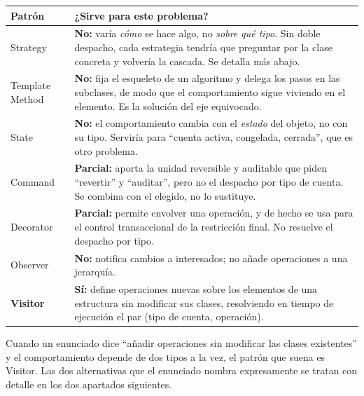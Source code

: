 \begin{table}[h!]
    \centering
    \small
    \begin{tabular}{p{2.9cm}p{12.1cm}}
        \toprule
        \textbf{Patrón} & \textbf{¿Sirve para este problema?} \\
        \midrule
        Strategy & \textbf{No:} varía \emph{cómo} se hace algo, no \emph{sobre qué tipo}. Sin
                   doble despacho, cada estrategia tendría que preguntar por la clase concreta
                   y volvería la cascada. Se detalla más abajo. \\
        \addlinespace
        Template Method & \textbf{No:} fija el esqueleto de un algoritmo y delega los pasos en
                          las subclases, de modo que el comportamiento sigue viviendo en el
                          elemento. Es la solución del eje equivocado. \\
        \addlinespace
        State & \textbf{No:} el comportamiento cambia con el \emph{estado} del objeto, no con
                su tipo. Serviría para ``cuenta activa, congelada, cerrada'', que es otro
                problema. \\
        \addlinespace
        Command & \textbf{Parcial:} aporta la unidad reversible y auditable que piden
                  ``revertir'' y ``auditar'', pero no el despacho por tipo de cuenta. Se
                  combina con el elegido, no lo sustituye. \\
        \addlinespace
        Decorator & \textbf{Parcial:} permite envolver una operación, y de hecho se usa para
                    el control transaccional de la restricción final. No resuelve el despacho
                    por tipo. \\
        \addlinespace
        Observer & \textbf{No:} notifica cambios a interesados; no añade operaciones a una
                   jerarquía. \\
        \addlinespace
        \textbf{Visitor} & \textbf{Sí:} define operaciones nuevas sobre los elementos de una
                           estructura sin modificar sus clases, resolviendo en tiempo de
                           ejecución el par (tipo de cuenta, operación). \\
        \bottomrule
    \end{tabular}
\end{table}

Cuando un enunciado dice ``añadir operaciones sin modificar las clases existentes'' y el
comportamiento depende de dos tipos a la vez, el patrón que suena es Visitor. Las dos
alternativas que el enunciado nombra expresamente se tratan con detalle en los dos apartados
siguientes.

